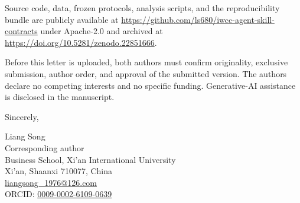 \documentclass[10pt]{article}
\begin{document}
Source code, data, frozen protocols, analysis scripts, and the reproducibility
bundle are publicly available at
\url{https://github.com/ls680/iwcc-agent-skill-contracts} under Apache-2.0 and
archived at \url{https://doi.org/10.5281/zenodo.22851666}.

Before this letter is uploaded, both authors must confirm originality,
exclusive submission, author order, and approval of the submitted version. The
authors declare no competing interests and no specific funding. Generative-AI
assistance is disclosed in the manuscript.

Sincerely,

Liang Song\\
Corresponding author\\
Business School, Xi'an International University\\
Xi'an, Shaanxi 710077, China\\
\href{mailto:liangsong_1976@126.com}{liangsong\_1976@126.com}\\
ORCID: \href{https://orcid.org/0009-0002-6109-0639}{0009-0002-6109-0639}
\end{document}
